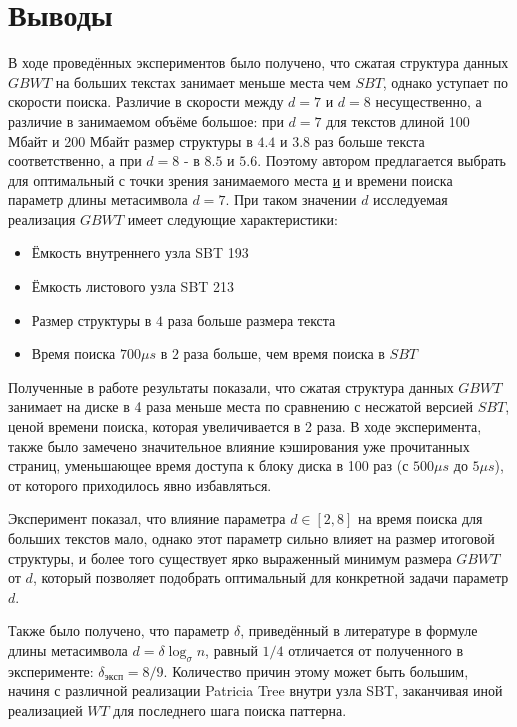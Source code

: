 \documentclass[a4paper,12pt]{article}
\begin{document}
\section{Выводы}
В ходе проведённых экспериментов было получено, что сжатая структура данных $GBWT$ на больших текстах занимает меньше места чем $SBT$, однако уступает по скорости поиска. Различие в скорости между $d=7$ и $d=8$ несущественно, а различие в занимаемом объёме большое: при $d = 7$ для текстов длиной 100 Мбайт и 200 Мбайт размер структуры в $4.4$ и $3.8$ раз больше текста соответственно, а при $d = 8$ - в $8.5$ и $5.6$. Поэтому автором предлагается выбрать для оптимальный с точки зрения занимаемого места \underline{и} и времени поиска параметр длины метасимвола $d = 7$. При таком значении $d$ исследуемая реализация $GBWT$ имеет следующие характеристики:
\begin{itemize}
    \item Ёмкость внутреннего узла SBT 193
    \item Ёмкость листового узла SBT 213
    \item Размер структуры в $4$ раза больше размера текста
    \item Время поиска $700 \mu s$ в $2$ раза больше, чем время поиска в $SBT$
\end{itemize}

Полученные в работе результаты показали, что сжатая структура данных $GBWT$ занимает на диске в 4 раза меньше места по сравнению с несжатой версией $SBT$, ценой времени поиска, которая увеличивается в 2 раза. В ходе эксперимента, также было замечено значительное влияние кэширования уже прочитанных страниц, уменьшающее время доступа к блоку диска в 100 раз (с $500 \mu s$ до $5\mu s$), от которого приходилось явно избавляться.

Эксперимент показал, что влияние параметра $d \in [2,8]$ на время поиска для больших текстов мало, однако этот параметр сильно влияет на размер итоговой структуры, и более того существует ярко выраженный минимум размера $GBWT$ от $d$, который позволяет подобрать оптимальный для конкретной задачи параметр $d$.

Также было получено, что параметр $\delta$, приведённый в литературе в формуле длины метасимвола $d = \delta \log_{\sigma}{n}$, равный $1/4$ отличается от полученного в эксперименте: $\delta_{эксп} = 8 / 9$. Количество причин этому может быть большим, начиня с различной реализации Patricia Tree внутри узла SBT, заканчивая иной реализацией $WT$ для последнего шага поиска паттерна.
\end{document}
